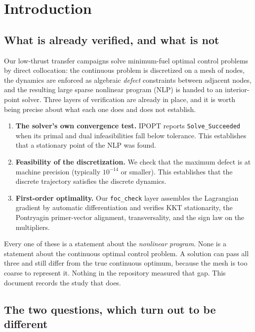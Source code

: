 \documentclass[11pt]{article}
\begin{document}
\section{Introduction}
\label{sec:intro}

\subsection{What is already verified, and what is not}

Our low-thrust transfer campaigns solve minimum-fuel optimal control problems
by direct collocation: the continuous problem is discretized on a mesh of
nodes, the dynamics are enforced as algebraic \emph{defect} constraints between
adjacent nodes, and the resulting large sparse nonlinear program (NLP) is
handed to an interior-point solver. Three layers of verification are already in
place, and it is worth being precise about what each one does and does not
establish.

\begin{enumerate}
  \item \textbf{The solver's own convergence test.} IPOPT reports
  \texttt{Solve\_Succeeded} when its primal and dual infeasibilities fall below
  tolerance. This establishes that a stationary point of the NLP was found.
  \item \textbf{Feasibility of the discretization.} We check that the maximum
  defect is at machine precision (typically $10^{-14}$ or smaller). This
  establishes that the discrete trajectory satisfies the discrete dynamics.
  \item \textbf{First-order optimality.} Our \texttt{foc\_check} layer assembles
  the Lagrangian gradient by automatic differentiation and verifies KKT
  stationarity, the Pontryagin primer-vector alignment, transversality, and the
  sign law on the multipliers.
\end{enumerate}

Every one of these is a statement about the \emph{nonlinear program}. None is a
statement about the continuous optimal control problem. A solution can pass all
three and still differ from the true continuous optimum, because the mesh is
too coarse to represent it. Nothing in the repository measured that gap. This
document records the study that does.

\subsection{The two questions, which turn out to be different}
\end{document}
